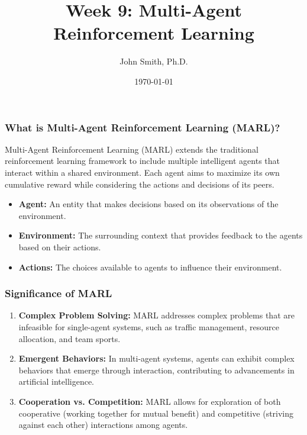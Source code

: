 \documentclass[aspectratio=169]{beamer}
\title[Multi-Agent Reinforcement Learning]{Week 9: Multi-Agent Reinforcement Learning}
\author[J. Smith]{John Smith, Ph.D.}
\institute[University Name]{
  Department of Computer Science\\
  University Name\\
  \vspace{0.3cm}
  Email: email@university.edu\\
  Website: www.university.edu
}
\date{\today}
\begin{document}
\frame{\titlepage}

\begin{frame}[fragile]
    \titlepage
\end{frame}

\begin{frame}[fragile]
    \frametitle{What is Multi-Agent Reinforcement Learning (MARL)?}
    Multi-Agent Reinforcement Learning (MARL) extends the traditional reinforcement learning framework to include multiple intelligent agents that interact within a shared environment. Each agent aims to maximize its own cumulative reward while considering the actions and decisions of its peers.
    
    \begin{itemize}
        \item \textbf{Agent:} An entity that makes decisions based on its observations of the environment.
        \item \textbf{Environment:} The surrounding context that provides feedback to the agents based on their actions.
        \item \textbf{Actions:} The choices available to agents to influence their environment.
    \end{itemize}
\end{frame}

\begin{frame}[fragile]
    \frametitle{Significance of MARL}
    \begin{enumerate}
        \item \textbf{Complex Problem Solving:} MARL addresses complex problems that are infeasible for single-agent systems, such as traffic management, resource allocation, and team sports.
        \item \textbf{Emergent Behaviors:} In multi-agent systems, agents can exhibit complex behaviors that emerge through interaction, contributing to advancements in artificial intelligence.
        \item \textbf{Cooperation vs. Competition:} MARL allows for exploration of both cooperative (working together for mutual benefit) and competitive (striving against each other) interactions among agents.
    \end{enumerate}
\end{frame}
\end{document}
